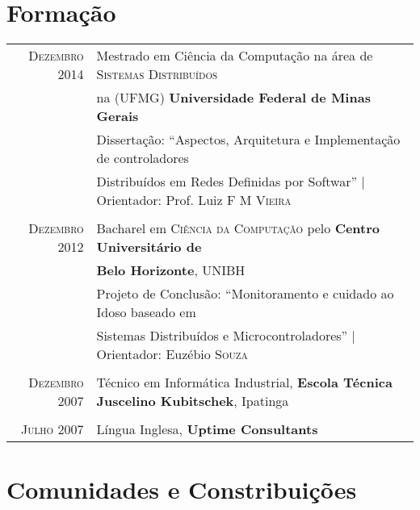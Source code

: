 \documentclass[a4paper,10pt]{article} %
\begin{document}
\section{Formação}

\begin{tabular}{rl}	
\textsc{Dezembro} 2014 & Mestrado em Ciência da Computação na área de 
\textsc{Sistemas Distribuídos} 
\\ & na (UFMG) 
\textbf{Universidade Federal de Minas Gerais} \\
& Dissertação: ``Aspectos, Arquitetura e Implementação de controladores
\\ & Distribuídos em Redes Definidas por Softwar'' 
| \small Orientador: Prof. Luiz \textsc{F M Vieira} \\ 
&\\


\textsc{Dezembro} 2012& Bacharel em \textsc{Ciência da Computação}
pelo \normalsize\textbf{Centro Universitário de} 
\\ & \textbf{Belo Horizonte}, UNIBH \\
& Projeto de Conclusão: ``Monitoramento e cuidado ao Idoso baseado em 
\\ & Sistemas Distribuídos e Microcontroladores'' 
| \small Orientador: Euzébio \textsc{Souza} \\
&\\


\textsc{Dezembro} 2007 & Técnico em Informática Industrial, 
\textbf{Escola Técnica Juscelino Kubitschek}, Ipatinga \\
&\\


\textsc{Julho} 2007 & Língua Inglesa, \textbf{Uptime Consultants}
\end{tabular}





\section{Comunidades e Constribuições}
\end{document}
